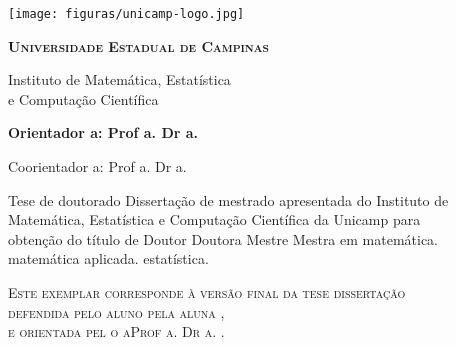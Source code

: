 \thispagestyle{plain}
\texttt{[image: figuras/unicamp-logo.jpg]}
\begin{center}
  {\large \scshape \bfseries Universidade Estadual de Campinas
  \vspace{.5cm}

  Instituto de Matemática, Estatística \\
  e Computação Científica}
\end{center}
\vspace{.7cm}
\begin{center}
  {\large \scshape \bfseries \autor}
\end{center}
\vspace{.7cm}
\begin{center}
  {\Large \scshape \bfseries \titulo}
\end{center}
\vspace{.8cm}
{\bfseries
\noindent
Orientador\ifx\femaleOrientador\undefined
\else
a\fi: Prof\ifx\femaleOrientador\undefined
\else
a\fi. Dr\ifx\femaleOrientador\undefined
\else
a\fi. \orientador
\vspace{.25cm}

\ifx\coorientador\undefined
\else
\noindent
Coorientador\ifx\femaleCoorientador\undefined
\else
a\fi: Prof\ifx\femaleCoorientador\undefined
\else
a\fi. Dr\ifx\femaleCoorientador\undefined
\else
a\fi. \coorientador
\fi
}

\vspace{.5cm}
\begin{flushright}
  \begin{minipage}[c]{.8\textwidth}
    \begin{flushright}
      \ifx\mestrado\undefined
      Tese de doutorado
      \else
      Dissertação de mestrado
      \fi
      apresentada do Instituto de \\ Matemática,
      Estatística e Computação Científica
      da Unicamp para \\ obtenção do título de
      \ifx\mestrado\undefined
      \ifx\femaleAuthor\undefined
      Doutor
      \else
      Doutora
      \fi
      \else
      \ifx\femaleAuthor\undefined
      Mestre
      \else
      Mestra
      \fi
      \fi
      em
      \ifx\matematica\undefined
      \else
      matemática.
      \fi
      \ifx\aplicada\undefined
      \else
      matemática aplicada.
      \fi
      \ifx\estatistica\undefined
      \else
      estatística.
      \fi
    \end{flushright}
  \end{minipage}
\end{flushright}
\vspace{.5cm}
\noindent
{\footnotesize \scshape
Este exemplar corresponde à versão final da 
\ifx\mestrado\undefined
tese
\else
dissertação
\fi \\
defendida 
\ifx\femaleAuthor\undefined
pelo aluno
\else
pela aluna
\fi
\autor,\\
e orientada pel\ifx\femaleOrientador\undefined
o\else
a\fi Prof\ifx\femaleOrientador\undefined
\else
a\fi. Dr\ifx\femaleOrientador\undefined
\else
a\fi. \orientador.
}
\vspace{1cm}

